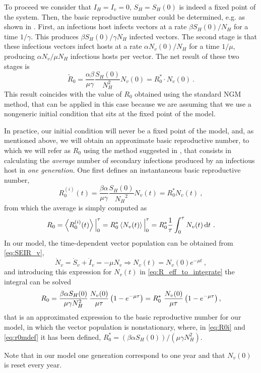 To proceed we consider that $I_H=I_v=0$, $S_H=S_H(0)$ is indeed a fixed
point of the system. Then, the basic reproductive number could be determined,
e.g. as shown in \cite{Brauer2016}. First, an infectious host infects vectors
at a rate $\beta S_H(0)/N_H$ for a time $1/\gamma$. This produces $\beta
    S_H(0)/\gamma N_H$ infected vectors. The second stage is that these
infectious
vectors infect hosts at a rate $\alpha N_v(0)/N_H$ for a time $1/\mu$,
producing $\alpha N_v/\mu N_H$ infectious hosts per vector. The net result of
these two stages is
\begin{equation}
    \tilde{R}_0=\frac{\alpha\beta}{\mu\gamma}
    \frac{S_H(0)}{N_H^2}N_v(0)=R_0^*
    \cdot
    N_v(0)\ .
    \label{eq:R0tilde}
\end{equation}
This result coincides with the value of $R_0$ obtained using the standard
NGM method, that can be applied in this case because we are assuming that we
use a nongeneric initial condition that sits at the fixed point of the model.

In practice, our initial condition will never be a fixed point of the
model, and, as mentioned above, we will obtain an approximate basic
reproductive number, to which we will refer as $R_0$ using the method suggested
in \cite{GimenezRomero2022_PRE}, that consists in
calculating the \textit{average} number of secondary infections produced by
an infectious host in \textit{one generation}. One first defines an
instantaneous basic reproductive number,
\begin{equation}\label{eq:R0i}
    R_0^{(i)}(t)=\frac{\beta\alpha}{\mu\gamma}\frac{S_H(0)}{{N_H}^2}
    N_v(t)=R_0^* N_v(t) \ ,
\end{equation}
from which the average is simply computed as
\begin{equation}\label{eq:R_eff_to_integrate}
    R_0=\left<R_0^{(i)}(t)\right>\Big\rvert_{0}^{\tau}=
    R_0^*\left<N_v(t)\right>\Big\rvert_{0}^{\tau}=
    R_0^*\frac{1}{\tau}\int_0^{\tau}N_v(t)
    \, \mathrm{d} t \ .
\end{equation}
In our model, the time-dependent vector population can be obtained from
\cref{eq:SEIR_v},
\begin{equation}
    \dot{N}_v=\dot{S}_v+\dot{I}_v=-\mu N_v \Longrightarrow
    N_v(t)=N_v(0)e^{-\mu t} \ ,
\end{equation}
and introducing this expression for $N_v(t)$ in
\cref{eq:R_eff_to_integrate} the integral can be solved
\begin{equation}
    R_0={{\beta\alpha S_H(0)}\over{\mu\gamma N_H ^2}}
    \,\frac{N_v(0)}{\mu\tau}\left(1-e^{-\mu\tau}\right)=
    R_0^*\ \frac{N_v(0)}{\mu\tau}\left(1-e^{-\mu\tau}\right) ,
    \label{eq:r0mdef}
\end{equation}
that is an approximated expression to the basic reproductive number for our
model, in which the vector population is nonstationary,
where, in \cref{eq:R0i} and \cref{eq:r0mdef} it has been defined, $R_0^*=
    (\beta\alpha S_H(0))/(\mu\gamma N_H ^2)$.

Note that in our model one generation correspond to one year and that
$N_v(0)$ is reset every year.